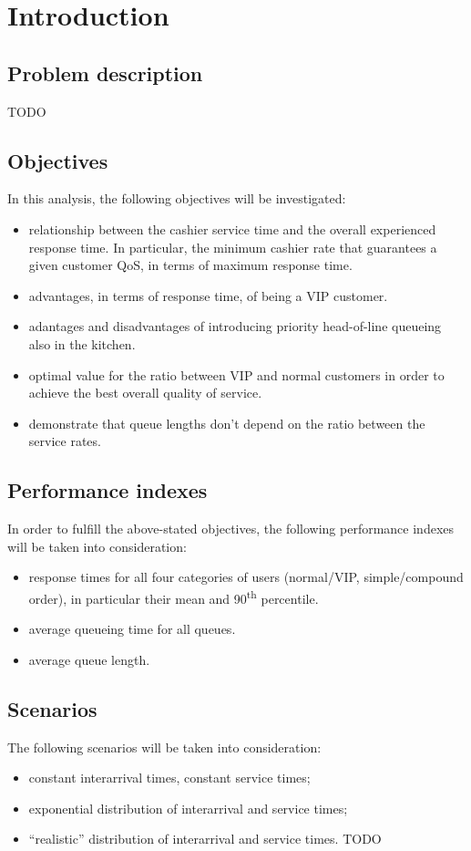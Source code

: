 \section{Introduction}

\subsection{Problem description}
TODO

\subsection{Objectives}
In this analysis, the following objectives will be investigated:
\begin{itemize}
    \item relationship between the cashier service time and the overall experienced
        response time. In particular, the minimum cashier rate that guarantees a 
        given customer QoS, in terms of maximum response time.
    \item advantages, in terms of response time, of being a VIP customer.
    \item adantages and disadvantages of introducing priority head-of-line queueing
        also in the kitchen.
    \item optimal value for the ratio between VIP and normal customers in order to achieve the best overall quality of service.
    \item demonstrate that queue lengths don't depend on the ratio between the service rates.
\end{itemize}

\subsection{Performance indexes}
In order to fulfill the above-stated objectives, the following performance 
indexes will be taken into consideration:
\begin{itemize}
    \item response times for all four categories of users (normal/VIP, 
    simple/compound order), in particular their mean and 90\textsuperscript{th} 
    percentile.
    \item average queueing time for all queues.
    \item average queue length.
\end{itemize}

\subsection{Scenarios}
The following scenarios will be taken into consideration:
\begin{itemize}
    \item constant interarrival times, constant service times;
    \item exponential distribution of interarrival and service times;
    \item ``realistic'' distribution of interarrival and service times. TODO
\end{itemize}
